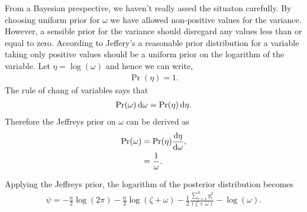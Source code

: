 \documentclass[11pt,twoside,a4paper]{article}
\begin{document}
  From a Bayesian prespective, we haven't really assed the situaton carefully.
  By choosing uniform prior for $\omega$ we have allowed non-positive values
  for the variance. However, a sensible prior for the variance should disregard
  any values less than or equal to zero. According to Jeffery's a reasonable
  prior distribution for a variable taking only positive values should be
  a uniform prior on the logarithm of the variable. Let $\eta = \log(\omega)$
  and hence we can write,
  \begin{align}
    \Pr(\eta) = 1.
  \end{align}
  The rule of chang of variables says that
  \begin{align}
    \Pr(\omega) \dif \omega = \Pr(\eta) \dif \eta.
  \end{align}
  Therefore the Jeffreys prior on $\omega$ can be derived as
  \begin{align}
    \Pr(\omega) &= \Pr(\eta) \frac {\dif \eta}{\dif \omega}, \\
    &= \frac{1}{\omega}.
  \end{align}

  Applying the Jeffreys prior, the logarithm of the posterior distribution
  becomes
  \begin{align}
    \psi  = - \frac{n}{2} \log (2 \pi) - \frac{n}{2} \log (\zeta + \omega)
      - \frac{1}{2} \frac{\sum_{i=1}^n y_i^2}{(\zeta + \omega)} - \log(\omega).
  \end{align}
\end{document}

